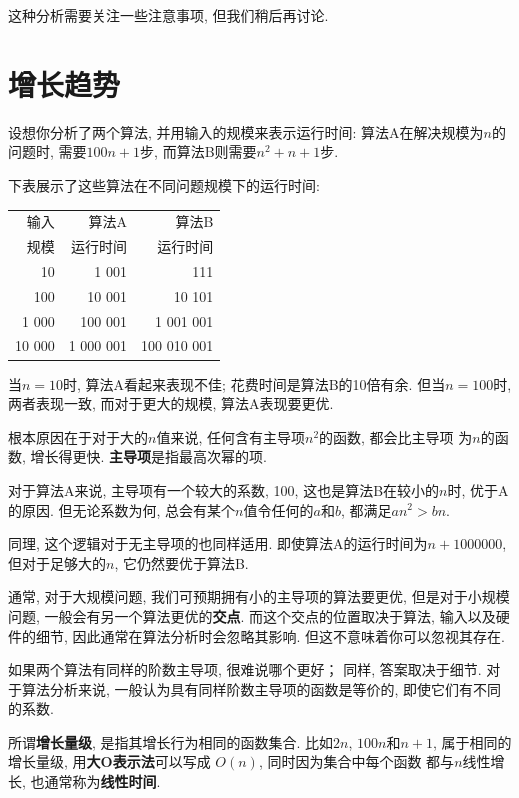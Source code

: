 \documentclass[10pt]{book}
\begin{document}
这种分析需要关注一些注意事项, 但我们稍后再讨论. 


\section{增长趋势}

设想你分析了两个算法, 并用输入的规模来表示运行时间:
算法A在解决规模为$n$的问题时, 需要$100n+1$步, 而算法B则需要$n^2 + n + 1$步. 

下表展示了这些算法在不同问题规模下的运行时间:

\begin{tabular}{|r|r|r|}
\hline
输入     &  算法A     & 算法B \\
规模      &   运行时间     & 运行时间 \\
\hline
10        &   1 001           & 111         \\
100       &   10 001          & 10 101         \\
1 000     &   100 001         & 1 001 001         \\
10 000    &   1 000 001       & 100 010 001         \\
\hline
\end{tabular}

当$n=10$时, 算法A看起来表现不佳; 花费时间是算法B的10倍有余. 
但当$n=100$时, 两者表现一致, 而对于更大的规模, 算法A表现要更优. 

根本原因在于对于大的$n$值来说, 任何含有主导项$n^2$的函数, 都会比主导项
为$n$的函数, 增长得更快. 
{\bf 主导项}是指最高次幂的项. 

对于算法A来说, 主导项有一个较大的系数, 100, 这也是算法B在较小的$n$时, 
优于A的原因. 但无论系数为何, 
总会有某个$n$值令任何的$a$和$b$, 都满足$a n^2 > b n$. 

同理, 这个逻辑对于无主导项的也同样适用. 
即使算法A的运行时间为$n+1000000$, 但对于足够大的$n$, 它仍然要优于算法B. 

通常, 对于大规模问题, 我们可预期拥有小的主导项的算法要更优, 
但是对于小规模问题, 一般会有另一个算法更优的{\bf 交点}. 
而这个交点的位置取决于算法, 输入以及硬件的细节, 
因此通常在算法分析时会忽略其影响. 但这不意味着你可以忽视其存在. 

如果两个算法有同样的阶数主导项, 很难说哪个更好；
同样, 答案取决于细节. 
对于算法分析来说, 一般认为具有同样阶数主导项的函数是等价的, 
即使它们有不同的系数. 

所谓{\bf 增长量级}, 是指其增长行为相同的函数集合. 
比如$2n$, $100n$和$n+1$, 属于相同的增长量级, 
用{\bf 大O表示法}可以写成 $O(n)$, 同时因为集合中每个函数
都与$n$线性增长, 也通常称为{\bf 线性时间}. 
\end{document}
